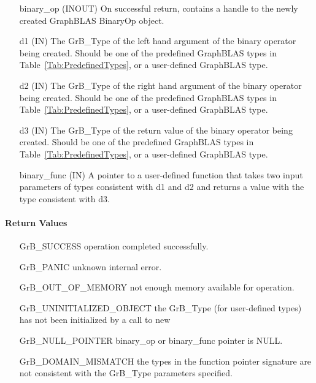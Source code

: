 \begin{itemize}[leftmargin=1.1in]
    \item[{\sf binary\_op}] ({\sf INOUT}) On successful return, contains a 
          handle to the newly created GraphBLAS BinaryOp object.
    \item[{\sf d1}]  ({\sf IN}) The {\sf GrB\_Type} of the left hand 
          argument of the binary operator being created. Should be one of the
          predefined GraphBLAS types in Table~\ref{Tab:PredefinedTypes}, or a
          user-defined GraphBLAS type.
    \item[{\sf d2}]  ({\sf IN}) The {\sf GrB\_Type} of the right hand 
          argument of the binary operator being created. Should be one of the
          predefined GraphBLAS types in Table~\ref{Tab:PredefinedTypes}, or a 
          user-defined GraphBLAS type.
    \item[{\sf d3}]  ({\sf IN}) The {\sf GrB\_Type} of the return
          value of the binary operator being created. Should be one of the
          predefined GraphBLAS types in Table~\ref{Tab:PredefinedTypes}, or a 
          user-defined GraphBLAS type.
    \item[{\sf binary\_func}] ({\sf IN}) A pointer to a user-defined function that 
          takes two input parameters of types consistent with {\sf d1} and 
          {\sf d2} and returns a value with the type consistent with {\sf d3}. 
\end{itemize}

\paragraph{Return Values}

\begin{itemize}[leftmargin=2.1in]
\item[{\sf GrB\_SUCCESS}]           operation completed successfully.
\item[{\sf GrB\_PANIC}]             unknown internal error.
\item[{\sf GrB\_OUT\_OF\_MEMORY}]          not enough memory available for operation.
\item[{\sf GrB\_UNINITIALIZED\_OBJECT}]          the {\sf GrB\_Type} (for user-defined types)
                                    has not been initialized by a call to {\sf new}
\item[{\sf GrB\_NULL\_POINTER}]    {\sf binary\_op} or {\sf binary\_func} pointer is {\sf NULL}.
\item[{\sf GrB\_DOMAIN\_MISMATCH}]  the types in the function pointer signature are not   
                                    consistent with the {\sf GrB\_Type} parameters specified.
\end{itemize}

